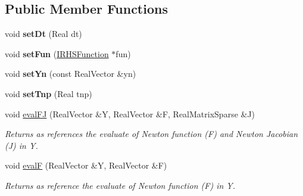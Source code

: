 \subsection*{Public Member Functions}
\begin{DoxyCompactItemize}
\item 
\hypertarget{classBESolverNewtonFunction_a4839e9f396001ec74f0ed84c60bceeea}{
void {\bfseries setDt} (Real dt)}
\label{classBESolverNewtonFunction_a4839e9f396001ec74f0ed84c60bceeea}

\item 
\hypertarget{classBESolverNewtonFunction_af8ac5afaee7f9150715d64864113728f}{
void {\bfseries setFun} (\hyperlink{classIRHSFunction}{IRHSFunction} $\ast$fun)}
\label{classBESolverNewtonFunction_af8ac5afaee7f9150715d64864113728f}

\item 
\hypertarget{classBESolverNewtonFunction_a6a0988dcce895a7da36f33adaa412a0c}{
void {\bfseries setYn} (const RealVector \&yn)}
\label{classBESolverNewtonFunction_a6a0988dcce895a7da36f33adaa412a0c}

\item 
\hypertarget{classBESolverNewtonFunction_a8120d01800736505481b08e47394fe84}{
void {\bfseries setTnp} (Real tnp)}
\label{classBESolverNewtonFunction_a8120d01800736505481b08e47394fe84}

\item 
\hypertarget{classBESolverNewtonFunction_aab571de51fc3667739191c93df8a0065}{
void \hyperlink{classBESolverNewtonFunction_aab571de51fc3667739191c93df8a0065}{evalFJ} (RealVector \&Y, RealVector \&F, RealMatrixSparse \&J)}
\label{classBESolverNewtonFunction_aab571de51fc3667739191c93df8a0065}

\begin{DoxyCompactList}\small\item\em Returns as references the evaluate of Newton function (F) and Newton Jacobian (J) in Y. \item\end{DoxyCompactList}\item 
\hypertarget{classBESolverNewtonFunction_a66238e6376f8ec8945a3867b3a065deb}{
void \hyperlink{classBESolverNewtonFunction_a66238e6376f8ec8945a3867b3a065deb}{evalF} (RealVector \&Y, RealVector \&F)}
\label{classBESolverNewtonFunction_a66238e6376f8ec8945a3867b3a065deb}

\begin{DoxyCompactList}\small\item\em Returns as reference the evaluate of Newton function (F) in Y. \item\end{DoxyCompactList}\end{DoxyCompactItemize}


